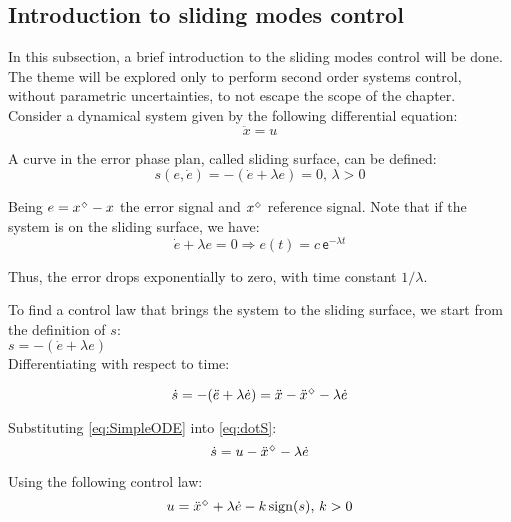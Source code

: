 \subsection{Introduction to sliding modes control}\label{S02-3}

In this subsection, a brief introduction to the sliding modes control will be done. The theme will be explored only to perform second order systems control, without parametric uncertainties, to not escape the scope of the chapter. \\

Consider a dynamical system given by the following differential equation:
\begin{equation} \label{eq:SimpleODE}
\ddot{x} = u
\end{equation}

A curve in the error phase plan, called sliding surface, can be defined:
\begin{equation} \label{eq:SlidingSurface}
s(e, \dot{e}) = - (\dot{e} + \lambda e) = 0, \, \lambda > 0
\end{equation}

Being $e = x^{\scriptscriptstyle \diamondsuit} - x$ the error signal and $x^{\scriptscriptstyle \diamondsuit}$ reference signal. Note that if the system is on the sliding surface, we have:
\begin{equation} \label{eq:SlidingError}
\dot{e} + \lambda e = 0 \Rightarrow e(t) = c \, \mathsf{e}^{- \lambda t}
\end{equation}

Thus, the error drops exponentially to zero, with time constant $1/\lambda$.

To find a control law that brings the system to the sliding surface, we start from the definition of $s$: \\

$ s = -(\dot{e} + \lambda e) $ \\

Differentiating with respect to time:

\begin{equation} \label{eq:dotS}
\dot{s} =  -(\ddot{e} + \lambda \dot{e}) = \ddot{x} - \ddot{x}^{\scriptscriptstyle \diamondsuit} - \lambda \dot{e} 
\end{equation}

Substituting \eqref{eq:SimpleODE} into \eqref{eq:dotS}:
\begin{equation} \label{dotS2}
\dot{s} = u - \ddot{x}^{\scriptscriptstyle \diamondsuit} - \lambda \dot{e}
\end{equation}

Using the following control law:
\begin{equation} \label{SMControlLaw1D}
u = \ddot{x}^{\scriptscriptstyle \diamondsuit} + \lambda \dot{e} - k \operatorname*{sign} (s), \, k>0
\end{equation}

